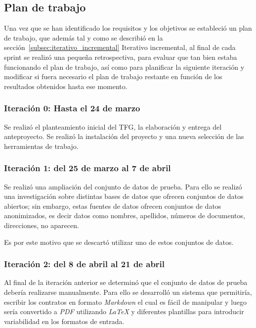\subsection*{Plan de trabajo}

Una vez que se han identificado los requisitos y los objetivos se estableció un plan de trabajo, que además tal y como
se describió en la sección~\ref{subsec:iterativo_incremental} Iterativo incremental, al final de cada sprint se realizó
una pequeña retrospectiva, para evaluar que tan bien estaba funcionando el plan de trabajo, así como para planificar
la siguiente iteración y modificar si fuera necesario el plan de trabajo restante en función de los resultados obtenidos
hasta ese momento.

\subsubsection*{Iteración 0: Hasta el 24 de marzo}

Se realizó el planteamiento inicial del TFG, la elaboración y entrega del anteproyecto.
Se realizó la instalación del proyecto y una nueva selección de las herramientas de trabajo.

\subsubsection*{Iteración 1: del 25 de marzo al 7 de abril}

Se realizó una ampliación del conjunto de datos de prueba.
Para ello se realizó una investigación sobre distintas bases de datos que ofrecen conjuntos de datos abiertos; sin
embargo, estas fuentes de datos ofrecen conjuntos de datos anonimizados, es decir datos como nombres, apellidos,
números de documentos, direcciones, no aparecen.

Es por este motivo que se descartó utilizar uno de estos conjuntos de datos.

\subsubsection*{Iteración 2: del 8 de abril al 21 de abril}

Al final de la iteración anterior se determinó que el conjunto de datos de prueba debería realizarse manualmente.
Para ello se desarrolló un sistema que permitiría, escribir los contratos en formato \textit{Markdown} el cual es fácil
de manipular y luego sería convertido a \textit{PDF} utilizando \textit{LaTeX} y diferentes plantillas para introducir
variabilidad en los formatos de entrada.

